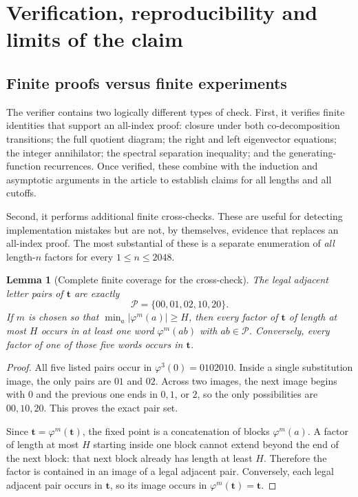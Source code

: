 \documentclass[11pt,a4paper]{article}
\newtheorem{lemma}[theorem]{Lemma}
\theoremstyle{definition}
\theoremstyle{remark}
\newcommand{\ttt}{\mathbf t}
\begin{document}
\section{Verification, reproducibility and limits of the claim}
\label{sec:verification}

\subsection{Finite proofs versus finite experiments}
The verifier contains two logically different types of check.
First, it verifies finite identities that support an all-index proof:
closure under both co-decomposition transitions; the full quotient diagram;
the right and left eigenvector equations; the integer annihilator; the
spectral separation inequality; and the generating-function recurrences.
Once verified, these combine with the induction and asymptotic arguments
in the article to establish claims for all lengths and all cutoffs.

Second, it performs additional finite cross-checks. These are useful for
detecting implementation mistakes but are not, by themselves, evidence
that replaces an all-index proof. The most substantial of these is a
separate enumeration of \emph{all} length-$n$ factors for every
$1\le n\le2048$.

\begin{lemma}[Complete finite coverage for the cross-check]\label{lem:paircheck}
The legal adjacent letter pairs of $\ttt$ are exactly
\[
 \mathcal P=\{00,01,02,10,20\}.
\]
If $m$ is chosen so that $\min_a|\varphi^m(a)|\ge H$, then every factor
of $\ttt$ of length at most $H$ occurs in at least one word
$\varphi^m(ab)$ with $ab\in\mathcal P$. Conversely, every factor of
one of those five words occurs in $\ttt$.
\end{lemma}
\begin{proof}
All five listed pairs occur in $\varphi^3(0)=0102010$. Inside a single
substitution image, the only pairs are $01$ and $02$. Across two images,
the next image begins with $0$ and the previous one ends in $0,1$, or $2$,
so the only possibilities are $00,10,20$. This proves the exact pair set.

Since $\ttt=\varphi^m(\ttt)$, the fixed point is a concatenation of blocks
$\varphi^m(a)$. A factor of length at most $H$ starting inside one block
cannot extend beyond the end of the next block: that next block already
has length at least $H$. Therefore the factor is contained in an image of
a legal adjacent pair. Conversely, each legal adjacent pair occurs in
$\ttt$, so its image occurs in $\varphi^m(\ttt)=\ttt$.
\end{proof}
\end{document}

